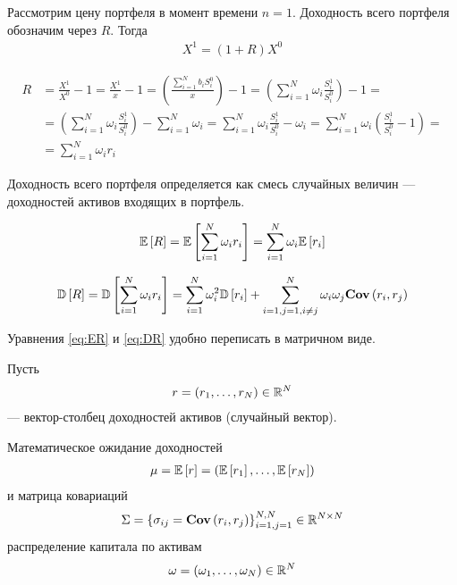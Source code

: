 Рассмотрим цену портфеля в момент времени $n=1$. Доходность всего портфеля обозначим через $R$. Тогда
\begin{align}
	X^1 = (1 + R) X^0
\end{align}

\begin{align}
	R &= \frac{X^1}{X^0} - 1 
	= \frac{X^1}{x} - 1 
	= \left(\frac{\sum_{i=1}^{N}b_i S_i^0}{x}\right) - 1 
	= \left(\sum_{i=1}^{N} \omega_i \frac{S_i^1}{S_i^0}\right) - 1 = \\
	&= \left(\sum_{i=1}^{N} \omega_i \frac{S_i^1}{S_i^0}\right) - \sum_{i=1}^{N} \omega_i
	= \sum_{i=1}^{N} \omega_i \frac{S_i^1}{S_i^0} - \omega_i 
	= \sum_{i=1}^{N} \omega_i \left(\frac{S_i^1}{S_i^0} - 1\right) = \\
	&= \sum_{i=1}^{N} \omega_i r_i
\end{align}

Доходность всего портфеля определяется как смесь случайных величин --- доходностей активов
входящих в портфель.

\begin{align} \label{eq:ER}
	\mathbb{E}\left[R\right] = \mathbb{E}\left[\sum_{i=1}^{N} \omega_i r_i\right] 
	= \sum_{i=1}^{N} \omega_i \mathbb{E}\left[r_i\right]
\end{align}

\begin{align} \label{eq:DR}
	\mathbb{D}\left[R\right] = \mathbb{D}\left[\sum_{i=1}^{N} \omega_i r_i\right] 
	= \sum_{i=1}^{N} \omega_i^2 \mathbb{D}\left[r_i\right] 
	+ \sum_{i=1, j=1, i \ne j}^{N} \omega_i \omega_j \textbf{Cov}\left(r_i, r_j\right)
\end{align}

Уравнения \ref{eq:ER} и \ref{eq:DR} удобно переписать в матричном виде. 

Пусть 
\begin{align}
	r = (r_1, \dots, r_N) \in \mathbb{R}^N
\end{align}
--- вектор-столбец доходностей активов (случайный вектор).

Математическое ожидание доходностей
\begin{align}
	\mu = \mathbb{E}\left[r\right] = \left(\mathbb{E}\left[r_1\right], \dots, \mathbb{E}\left[r_N\right]\right)	
\end{align}
и матрица ковариаций
\begin{align}
	\Sigma = \left\{\sigma_{ij} = \textbf{Cov}\left(r_i, r_j\right)\right\}_{i=1, j=1}^{N, N} \in \mathbb{R}^{N \times N}
\end{align}
распределение капитала по активам
\begin{align}
	\omega = \left(\omega_1, \dots, \omega_N \right) \in \mathbb{R}^N
\end{align}

